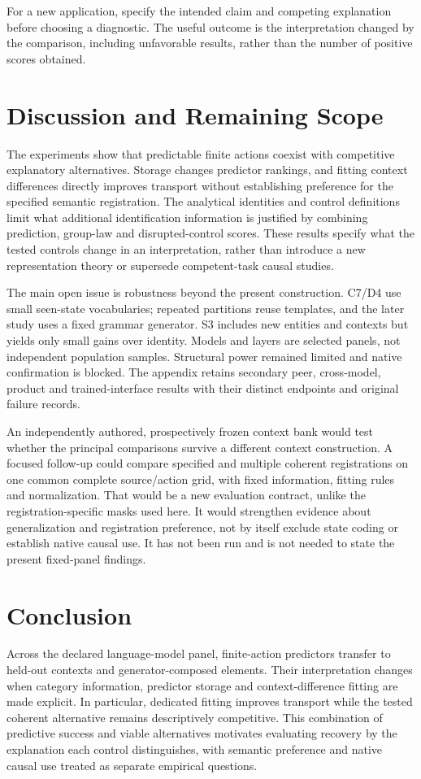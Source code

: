 \documentclass{article}
\begin{document}
For a new application, specify the intended claim and competing explanation before choosing a diagnostic. The useful outcome is the interpretation changed by the comparison, including unfavorable results, rather than the number of positive scores obtained.

\section{Discussion and Remaining Scope}
The experiments show that predictable finite actions coexist with competitive explanatory alternatives. Storage changes predictor rankings, and fitting context differences directly improves transport without establishing preference for the specified semantic registration. The analytical identities and control definitions limit what additional identification information is justified by combining prediction, group-law and disrupted-control scores. These results specify what the tested controls change in an interpretation, rather than introduce a new representation theory or supersede competent-task causal studies.

The main open issue is robustness beyond the present construction. C7/D4 use small seen-state vocabularies; repeated partitions reuse templates, and the later study uses a fixed grammar generator. S3 includes new entities and contexts but yields only small gains over identity. Models and layers are selected panels, not independent population samples. Structural power remained limited and native confirmation is blocked. The appendix retains secondary peer, cross-model, product and trained-interface results with their distinct endpoints and original failure records.

An independently authored, prospectively frozen context bank would test whether the principal comparisons survive a different context construction. A focused follow-up could compare specified and multiple coherent registrations on one common complete source/action grid, with fixed information, fitting rules and normalization. That would be a new evaluation contract, unlike the registration-specific masks used here. It would strengthen evidence about generalization and registration preference, not by itself exclude state coding or establish native causal use. It has not been run and is not needed to state the present fixed-panel findings.

\section{Conclusion}
Across the declared language-model panel, finite-action predictors transfer to held-out contexts and generator-composed elements. Their interpretation changes when category information, predictor storage and context-difference fitting are made explicit. In particular, dedicated fitting improves transport while the tested coherent alternative remains descriptively competitive. This combination of predictive success and viable alternatives motivates evaluating recovery by the explanation each control distinguishes, with semantic preference and native causal use treated as separate empirical questions.
\end{document}
